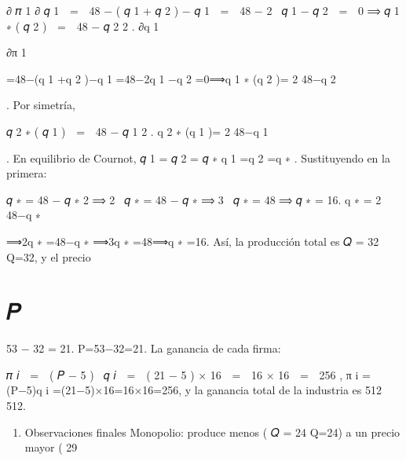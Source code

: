 \documentclass[
]{article}
\providecommand{\tightlist}{%
  \setlength{\itemsep}{0pt}\setlength{\parskip}{0pt}}
\begin{document}
∂ 𝜋 1 ∂ 𝑞 1    =    48 − ( 𝑞 1 + 𝑞 2 ) − 𝑞 1    =    48 − 2   𝑞 1 − 𝑞 2
   =    0 ⟹ 𝑞 1 ∗ ( 𝑞 2 )    =    48 − 𝑞 2 2 . ∂q 1 \hspace{0pt}

∂π 1 \hspace{0pt}

\hspace{0pt}=48−(q 1 \hspace{0pt} +q 2 \hspace{0pt} )−q 1 \hspace{0pt}
=48−2q 1 \hspace{0pt} −q 2 \hspace{0pt} =0⟹q 1 ∗ \hspace{0pt} (q 2
\hspace{0pt} )= 2 48−q 2 \hspace{0pt}

\hspace{0pt}. Por simetría,

𝑞 2 ∗ ( 𝑞 1 )    =    48 − 𝑞 1 2 . q 2 ∗ \hspace{0pt} (q 1 \hspace{0pt}
)= 2 48−q 1 \hspace{0pt}

\hspace{0pt}. En equilibrio de Cournot, 𝑞 1 = 𝑞 2 = 𝑞 ∗ q 1 \hspace{0pt}
=q 2 \hspace{0pt} =q ∗ . Sustituyendo en la primera:

𝑞 ∗ = 48 − 𝑞 ∗ 2 ⟹ 2   𝑞 ∗ = 48 − 𝑞 ∗ ⟹ 3   𝑞 ∗ = 48 ⟹ 𝑞 ∗ = 16. q ∗ = 2
48−q ∗

\hspace{0pt}⟹2q ∗ =48−q ∗ ⟹3q ∗ =48⟹q ∗ =16. Así, la producción total es
𝑄 = 32 Q=32, y el precio

\section{𝑃}\label{ux1d443}

53 − 32 = 21. P=53−32=21. La ganancia de cada firma:

𝜋 𝑖    =    ( 𝑃 − 5 )   𝑞 𝑖    =    ( 21 − 5 ) × 16    =    16 × 16    =
   256 , π i \hspace{0pt} =(P−5)q i \hspace{0pt} =(21−5)×16=16×16=256, y
la ganancia total de la industria es 512 512.

\begin{enumerate}
\def\labelenumi{(\alph{enumi})}
\setcounter{enumi}{2}
\tightlist
\item
  Observaciones finales Monopolio: produce menos ( 𝑄 = 24 Q=24) a un
  precio mayor ( 29
\end{enumerate}
\end{document}
